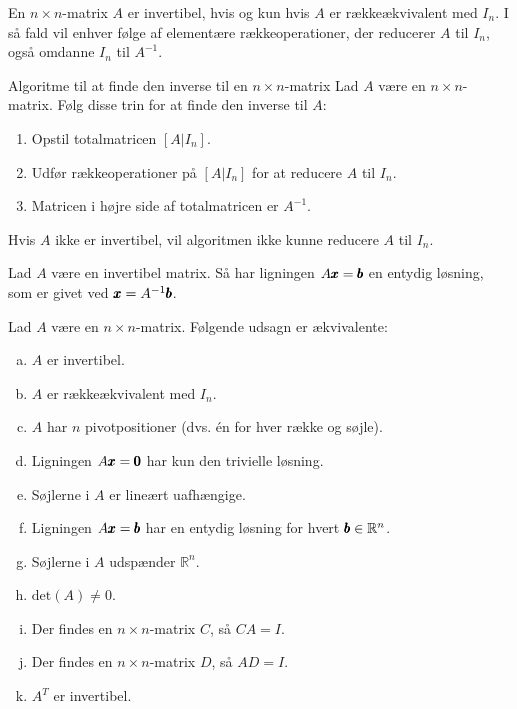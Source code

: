 \begin{theorem}
    En $n \times n$-matrix $A$ er invertibel, hvis og kun hvis $A$ er rækkeækvivalent med $I_n$. I så fald vil enhver følge af elementære rækkeoperationer, der reducerer $A$ til $I_n$, også omdanne $I_n$ til $A^{-1}$.
\end{theorem}

\begin{custombox}{Algoritme til at finde den inverse til en $n \times n$-matrix}
    Lad $A$ være en $n \times n$-matrix. Følg disse trin for at finde den inverse til $A$:
    \begin{enumerate}
        \item Opstil totalmatricen $[A | I_n]$.
        \item Udfør rækkeoperationer på $[A | I_n]$ for at reducere $A$ til $I_n$.
        \item Matricen i højre side af totalmatricen er $A^{-1}$.
    \end{enumerate}

    Hvis $A$ ikke er invertibel, vil algoritmen ikke kunne reducere $A$ til $I_n$.
\end{custombox}

\begin{theorem}
    Lad \( A \) være en invertibel matrix. Så har ligningen \( A \pmb{x} = \pmb{b} \) en entydig løsning, som er givet ved \( \pmb{x} = A^{-1} \pmb{b} \).
\end{theorem}

\begin{theorem}
    Lad \( A \) være en \( n \times n \)-matrix. Følgende udsagn er ækvivalente:
    \begin{enumerate}[(a)]
        \item $A$ er invertibel.
        \item $A$ er rækkeækvivalent med $I_n$.
        \item $A$ har $n$ pivotpositioner (dvs. én for hver række og søjle).
        \item Ligningen $A \pmb{x}=\pmb{0}$ har kun den trivielle løsning.
        \item Søjlerne i $A$ er lineært uafhængige.
        \item Ligningen \( A \pmb{x} = \pmb{b} \) har en entydig løsning for hvert \( \pmb{b} \in \mathbb{R}^n \).
        \item Søjlerne i $A$ udspænder $\mathbb{R}^n$.
        \item \( \text{det}(A) \neq 0 \).
        \item Der findes en $n \times n$-matrix $C$, så $C A=I$.
        \item Der findes en $n \times n$-matrix $D$, så $A D=I$.
        \item $A^T$ er invertibel.
    \end{enumerate}
\end{theorem}

